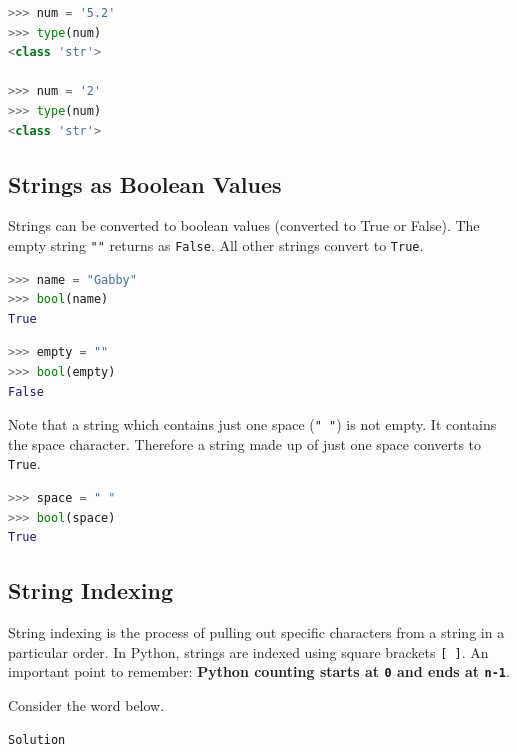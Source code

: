\documentclass{book}
\begin{document}
\begin{lstlisting}[language=Python]
>>> num = '5.2'
>>> type(num)
<class 'str'>

>>> num = '2'
>>> type(num)
<class 'str'>
\end{lstlisting}
    




    
        \subsection{Strings as Boolean Values}\label{strings-as-boolean-values}

Strings can be converted to boolean values (converted to True or False).
The empty string \lstinline!""! returns as \lstinline!False!. All other
strings convert to \lstinline!True!.

\begin{lstlisting}[language=Python]
>>> name = "Gabby"
>>> bool(name)
True
\end{lstlisting}

\begin{lstlisting}[language=Python]
>>> empty = ""
>>> bool(empty)
False
\end{lstlisting}

Note that a string which contains just one space (\lstinline!" "!) is
not empty. It contains the space character. Therefore a string made up
of just one space converts to \lstinline!True!.

\begin{lstlisting}[language=Python]
>>> space = " "
>>> bool(space)
True
\end{lstlisting}
    




    
        \subsection{String Indexing}\label{string-indexing}

String indexing is the process of pulling out specific characters from a
string in a particular order. In Python, strings are indexed using
square brackets \lstinline![ ]!. An important point to remember:
\textbf{Python counting starts at \lstinline!0! and ends at
\lstinline!n-1!}.

Consider the word below.

\begin{lstlisting}
Solution
\end{lstlisting}
\end{document}
